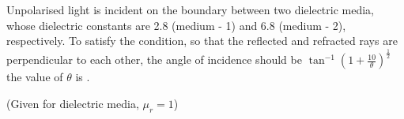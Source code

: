 \item Unpolarised light is incident on the boundary between two dielectric media, whose dielectric constants are 2.8 (medium - 1) and 6.8 (medium - 2), respectively. To satisfy the condition, so that the reflected and refracted rays are perpendicular to each other, the angle of incidence should be 
\(\tan^{-1} \left(1 + \frac{10}{\theta}\right)^{\frac{1}{2}}\)
the value of \(\theta\) is \underline{\hspace{2.5cm}}.

    (Given for dielectric media, \(\mu_r = 1\))